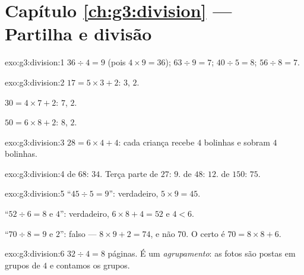 \section*{Capítulo \ref{ch:g3:division} --- Partilha e divisão}

\begin{solution}{exo:g3:division:1}
$36 \div 4 = 9$ (pois $4 \times 9 = 36$); \quad
$63 \div 9 = 7$; \quad $40 \div 5 = 8$; \quad $56 \div 8 = 7$.
\end{solution}

\begin{solution}{exo:g3:division:2}
$17 = 5 \times 3 + 2$:  $3$,  $2$.

$30 = 4 \times 7 + 2$:  $7$,  $2$.

$50 = 6 \times 8 + 2$:  $8$,  $2$.
\end{solution}

\begin{solution}{exo:g3:division:3}
$28 = 6 \times 4 + 4$: cada criança recebe $4$ bolinhas e sobram $4$
bolinhas.
\end{solution}

\begin{solution}{exo:g3:division:4}
 de $68$: $34$. Terça parte de $27$: $9$.  de
$48$: $12$.  de $150$: $75$.
\end{solution}

\begin{solution}{exo:g3:division:5}
``$45 \div 5 = 9$'': verdadeiro, $5 \times 9 = 45$.

``$52 \div 6 = 8$ e  $4$'': verdadeiro, $6 \times 8 + 4 = 52$ e
$4 < 6$.

``$70 \div 8 = 9$ e  $2$'': falso --- $8 \times 9 + 2 = 74$, e
não $70$. O certo é $70 = 8 \times 8 + 6$.
\end{solution}

\begin{solution}{exo:g3:division:6}
$32 \div 4 = 8$ páginas. É um \emph{agrupamento}: as fotos são
postas em grupos de $4$ e contamos os grupos.
\end{solution}

